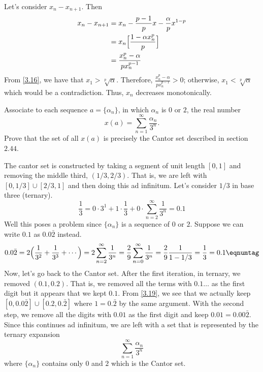 \begin{exercise}
\begin{align*}
  \end{align*}
  Let's consider \(x_n - x_{n + 1}\).
  Then
  \begin{align*}
    x_n - x_{n + 1} & = x_n - \frac{p - 1}{p}x - \frac{\alpha}{p}x^{1 - p}\\
                    & = x_n\Bigl[\frac{1 - \alpha x_n^p}{p}\Bigr]\\
                    & = \frac{x_n^p - \alpha}{px_n^{p - 1}}
  \end{align*}
  From \cref{3.16}, we have that \(x_1 > \sqrt[p]{\alpha}\).
  Therefore, \(\frac{x_n^p - \alpha}{px_n^{p - 1}} > 0\); otherwise,
  \(x_1 < \sqrt[p]{\alpha}\) which would be a contradiction.
  Thus, \(x_n\) decreases monotonically.
\item
  Associate to each sequence \(a = \{\alpha_n\}\), in which \(\alpha_n\) is
  \(0\) or \(2\), the real number
  \[
  x(a) = \sum_{n = 1}^{\infty}\frac{\alpha_n}{3^n}.
  \]
  Prove that the set of all \(x(a)\) is precisely the Cantor set described in
  section \(2.44\).
  \par\smallskip
  The cantor set is constructed by taking a segment of unit length \([0,1]\)
  and removing the middle third, \((1/3,2/3)\).
  That is, we are left with \([0,1/3] \cup [2/3,1]\) and then doing this ad
  infinitum.
  Let's consider \(1/3\) in base three (ternary).
  \[
  \frac{1}{3} = 0\cdot 3^1 + 1\cdot\frac{1}{3} + 0\cdot
  \sum_{n = 2}^{\infty}\frac{1}{3^n} = 0.1
  \]
  Well this poses a problem since \(\{\alpha_n\}\) is a sequence of \(0\) or
  \(2\).
  Suppose we can write \(0.1\) as \(0.0\bar{2}\) instead. 
  \[
  0.0\bar{2} = 2\Bigl(\frac{1}{3^2} + \frac{1}{3^3} + \cdots\Bigr) =
  2\sum_{n = 2}^{\infty}\frac{1}{3^n} =
  \frac{2}{9}\sum_{n = 0}^{\infty}\frac{1}{3^n} = \frac{2}{9}\frac{1}{1-1/3} =
  \frac{1}{3} = 0.1\eqnumtag\label{3.19}
  \]
  Now, let's go back to the Cantor set.
  After the first iteration, in ternary, we removed \((0.1, 0.2)\).
  That is, we removed all the terms with \(0.1\ldots\) as the first digit but
  it appears that we kept \(0.1\).
  From \cref{3.19}, we see that we actually keep
  \([0, 0.0\bar{2}] \cup [0.2, 0.\bar{2}]\) where \(1 = 0.\bar{2}\) by the
  same argument.
  With the second step, we remove all the digits with \(0.01\) as the first
  digit and keep \(0.01 = 0.00\bar{2}\).
  Since this continues ad infinitum, we are left with a set that is
  represented by the ternary expansion
  \[
  \sum_{n = 1}^{\infty}\frac{\alpha_n}{3^n}
  \]
  where \(\{\alpha_n\}\) contains only \(0\) and \(2\) which is the Cantor set.
\item

\end{exercise}
